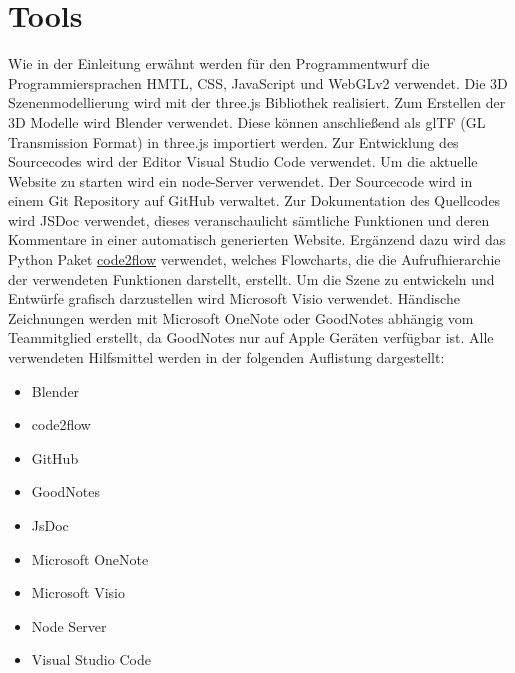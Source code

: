 \section{Tools}
Wie in der Einleitung erwähnt werden für den Programmentwurf die Programmiersprachen HMTL, CSS, JavaScript und WebGLv2 verwendet.
Die 3D Szenenmodellierung wird mit der three.js Bibliothek realisiert.
Zum Erstellen der 3D Modelle wird Blender verwendet. Diese können anschließend als
glTF (GL Transmission Format) in three.js importiert werden.
\newparagraph
Zur Entwicklung des Sourcecodes wird der Editor Visual Studio Code verwendet.
Um die aktuelle Website zu starten wird ein node-Server verwendet.
Der Sourcecode wird in einem Git Repository auf GitHub verwaltet.
Zur Dokumentation des Quellcodes wird JSDoc verwendet, dieses veranschaulicht sämtliche Funktionen und deren Kommentare in einer automatisch generierten Website.
Ergänzend dazu wird das Python Paket \href{https://github.com/scottrogowski/code2flow}{code2flow} verwendet, welches Flowcharts, die die Aufrufhierarchie der verwendeten Funktionen darstellt, erstellt.
\newparagraph
Um die Szene zu entwickeln und Entwürfe grafisch darzustellen wird Microsoft Visio verwendet.
Händische Zeichnungen werden mit Microsoft OneNote oder GoodNotes abhängig vom Teammitglied erstellt,
da GoodNotes nur auf Apple Geräten verfügbar ist.
\newparagraph
Alle verwendeten Hilfsmittel werden in der folgenden Auflistung dargestellt:
\begin{itemize}
  \item Blender
  \item code2flow
  \item GitHub
  \item GoodNotes
  \item JsDoc
  \item Microsoft OneNote
  \item Microsoft Visio
  \item Node Server
  \item Visual Studio Code
\end{itemize}